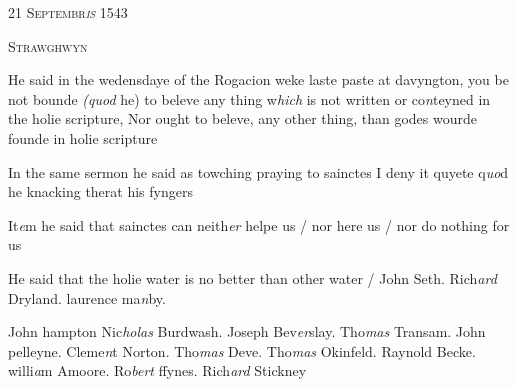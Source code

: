 \documentclass[12pt, a4paper]{book}
\begin{document}
            
            
               
				\begin{center} \begin{large} {\scshape 
               	 21 Septembr\textit{is} 1543
               } \end{large} \end{center}
			
               
               	
				\begin{center}  {\scshape Strawghwyn}  \end{center}
			
               	
               		
               		
		\ifthenelse{\isodd{\thepage}}
		{\reversemarginpar}
		{\normalmarginpar}
		He said in the wedensdaye of the Rogacion weke laste
 paste at davyngton, you be not bounde \textit{(quod} he)
 to beleve any thing w\textit{hich} is not written or co\textit{n}teyned
 in the holie scripture, Nor ought to beleve, any
 other thing, than godes wourde founde in holie scripture
               	
               		
				\marginpar[\vspace{0.5cm}{\textcolor{Gray}{prayinge to sayntes}}]{}
			
               		
		\ifthenelse{\isodd{\thepage}}
		{\reversemarginpar}
		{\normalmarginpar}
		In the same sermon he said as towching praying to
               			sainctes I deny it quyete q\textit{uo}d he knacking therat
               			his fyngers
               		
		\ifthenelse{\isodd{\thepage}}
		{\reversemarginpar}
		{\normalmarginpar}
		It\textit{e}m he said that sainctes can neith\textit{er} helpe us / nor
               			here us / nor do nothing for us
               		
		\ifthenelse{\isodd{\thepage}}
		{\reversemarginpar}
		{\normalmarginpar}
		He said that the holie water is no better than other
               			water / John Seth. Rich\textit{ard} Dryland. laurence ma\textit{n}by.
               		
		\ifthenelse{\isodd{\thepage}}
		{\reversemarginpar}
		{\normalmarginpar}
		John hampton Nic\textit{holas} Burdwash. Joseph Bev\textit{er}slay. Tho\textit{mas} Transam. John pelleyne.
               			Cleme\textit{n}t Norton. Tho\textit{mas} Deve. Tho\textit{mas} Okinfeld. Raynold Becke. willi\textit{a}m Amoore.
               			Ro\textit{bert} ffynes. Rich\textit{ard} Stickney
               	
\end{document}
